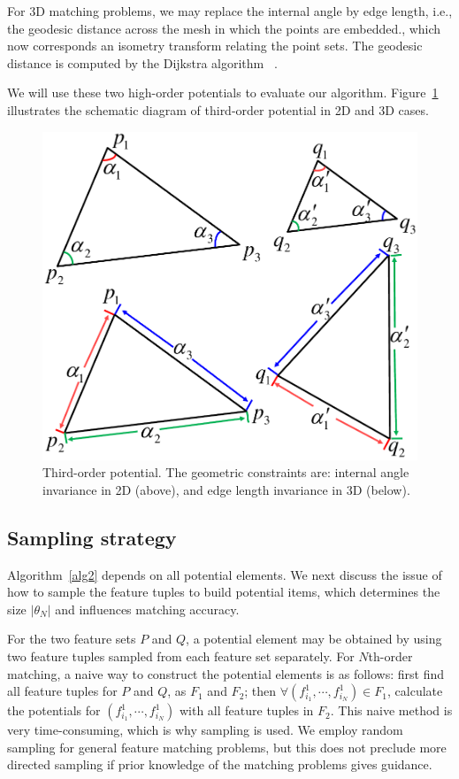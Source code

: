 For 3D matching problems, we may replace the internal angle by edge length, i.e., the geodesic distance across the mesh in which the points are embedded., which now corresponds
an isometry transform relating the point sets.
The geodesic distance is computed by the Dijkstra algorithm~\cite{Peyre2010} .

We will use these two high-order potentials to evaluate our algorithm.
Figure~\ref{fig:TO} illustrates the schematic diagram of third-order potential in 2D and 3D cases.

\begin{figure}
\centering
  \includegraphics[width=0.7\linewidth]{figures/diagram.pdf}
  \caption{Third-order potential. The geometric constraints are: internal angle invariance in 2D (above), and edge length invariance in 3D (below).}
\label{fig:TO}
\end{figure}

\subsection{Sampling strategy}
\label{subsec:sampling}

Algorithm~\ref{alg2} depends on all potential elements.
We next discuss the issue of how to sample the feature tuples to build potential items, which determines the size $|\theta_N|$ and influences matching accuracy.

For the two feature sets $P$ and $Q$,
a potential element may be obtained by using two feature tuples sampled from each feature set separately.
For $N$th-order matching, a naive way to construct the potential elements is as follows:
first find all feature tuples for $P$ and $Q$, as $F_1$ and $F_2$; then $\forall (f_{i_1}^1, \cdots, f_{i_N}^1)\in F_1$,
calculate the potentials for $(f_{i_1}^1, \cdots, f_{i_N}^1)$ with all feature tuples in $F_2$.
This naive method is very time-consuming, which is why sampling is used.
We employ random sampling for general feature matching problems,
but this does not preclude more directed sampling if prior knowledge of the matching problems gives guidance.

